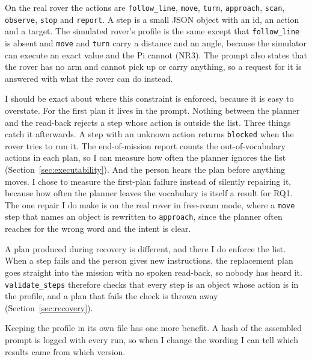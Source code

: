 On the real rover the actions are \texttt{follow\_line}, \texttt{move},
\texttt{turn}, \texttt{approach}, \texttt{scan}, \texttt{observe}, \texttt{stop}
and \texttt{report}. A step is a small JSON object with an id, an action and a
target. The simulated rover's profile is the same except that
\texttt{follow\_line} is absent and \texttt{move} and \texttt{turn} carry a
distance and an angle, because the simulator can execute an exact value and the
Pi cannot (NR3). The prompt also states that the rover has no arm and cannot pick
up or carry anything, so a request for it is answered with what the rover can do
instead.

I should be exact about where this constraint is enforced, because it is easy to
overstate. For the first plan it lives in the prompt. Nothing between the planner
and the read-back rejects a step whose action is outside the list. Three things
catch it afterwards. A step with an unknown action returns \texttt{blocked} when
the rover tries to run it. The end-of-mission report counts the out-of-vocabulary
actions in each plan, so I can measure how often the planner ignores the list
(Section~\ref{sec:executability}). And the person hears the plan before anything
moves. I chose to measure the first-plan failure instead of silently repairing it,
because how often the planner leaves the vocabulary is itself a result for RQ1.
The one repair I do make is on the real rover in free-roam mode, where a
\texttt{move} step that names an object is rewritten to \texttt{approach}, since
the planner often reaches for the wrong word and the intent is clear.

A plan produced during recovery is different, and there I do enforce the list.
When a step fails and the person gives new instructions, the replacement plan
goes straight into the mission with no spoken read-back, so nobody has heard it.
\texttt{validate\_steps} therefore checks that every step is an object whose
action is in the profile, and a plan that fails the check is thrown away
(Section~\ref{sec:recovery}).

Keeping the profile in its own file has one more benefit. A hash of the assembled
prompt is logged with every run, so when I change the wording I can tell which
results came from which version.

\label{sec:clarification_design}


